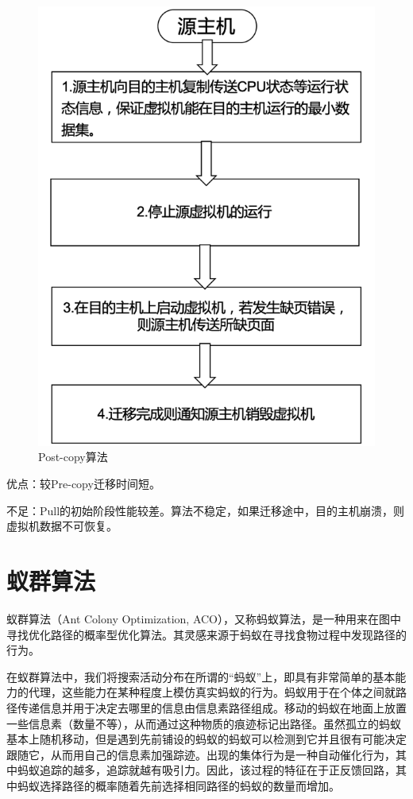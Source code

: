 \begin{figure}[htbp]
  \centering
  \includegraphics{./Figure/IMG_Chap2_5.png}
  \caption{Post-copy算法}\label{Fig:chap2_5}
\end{figure}

优点：较Pre-copy迁移时间短。

不足：Pull的初始阶段性能较差。算法不稳定，如果迁移途中，目的主机崩溃，则虚拟机数据不可恢复。

\section{蚁群算法}
蚁群算法（Ant Colony Optimization, ACO），又称蚂蚁算法，是一种用来在图中寻找优化路径的概率型优化算法。其灵感来源于蚂蚁在寻找食物过程中发现路径的行为\cite{Maniezzo}。

在蚁群算法中，我们将搜索活动分布在所谓的“蚂蚁”上，即具有非常简单的基本能力的代理，这些能力在某种程度上模仿真实蚂蚁的行为。蚂蚁用于在个体之间就路径传递信息并用于决定去哪里的信息由信息素路径组成。移动的蚂蚁在地面上放置一些信息素（数量不等），从而通过这种物质的痕迹标记出路径。虽然孤立的蚂蚁基本上随机移动，但是遇到先前铺设的蚂蚁的蚂蚁可以检测到它并且很有可能决定跟随它，从而用自己的信息素加强踪迹。出现的集体行为是一种自动催化行为，其中蚂蚁追踪的越多，追踪就越有吸引力。因此，该过程的特征在于正反馈回路，其中蚂蚁选择路径的概率随着先前选择相同路径的蚂蚁的数量而增加。

